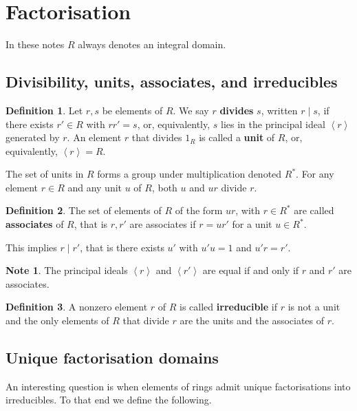\documentclass{article}
\newcommand{\ab}[1]{\left\langle #1 \right\rangle}
\theoremstyle{definition}\newtheorem{definition}{Definition}[subsection]
\theoremstyle{definition}\newtheorem{remark}[definition]{Remark}
\theoremstyle{definition}\newtheorem*{example}{Example}
\theoremstyle{definition}\newtheorem*{note}{Note}
\begin{document}
\section{Factorisation}

In these notes $ R $ always denotes an integral domain.

\subsection{Divisibility, units, associates, and irreducibles}

\begin{definition}
Let $ r, s $ be elements of $ R $. We say $ r $ \textbf{divides} $ s $, written $ r \mid s $, if there exists $ r' \in R $ with $ rr' = s $, or, equivalently, $ s $ lies in the principal ideal $ \ab{r} $ generated by $ r $. An element $ r $ that divides $ 1_R $ is called a \textbf{unit} of $ R $, or, equivalently, $ \ab{r} = R $.
\end{definition}

The set of units in $ R $ forms a group under multiplication denoted $ R^* $. For any element $ r \in R $ and any unit $ u $ of $ R $, both $ u $ and $ ur $ divide $ r $.

\begin{definition}
The set of elements of $ R $ of the form $ ur $, with $ r \in R^* $ are called \textbf{associates} of $ R $, that is $ r, r' $ are associates if $ r = ur' $ for a unit $ u \in R^* $.
\end{definition}

This implies $ r \mid r' $, that is there exists $ u' $ with $ u'u = 1 $ and $ u'r = r' $.

\begin{note}
The principal ideals $ \ab{r} $ and $ \ab{r'} $ are equal if and only if $ r $ and $ r' $ are associates.
\end{note}

\begin{definition}
A nonzero element $ r $ of $ R $ is called \textbf{irreducible} if $ r $ is not a unit and the only elements of $ R $ that divide $ r $ are the units and the associates of $ r $.
\end{definition}

\subsection{Unique factorisation domains}

An interesting question is when elements of rings admit unique factorisations into irreducibles. To that end we define the following.
\end{document}
